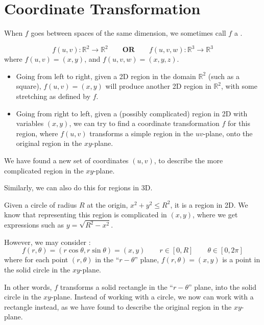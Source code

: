 \section{Coordinate Transformation}

\begin{definition}
    When $f$ goes between spaces of the same dimension, we sometimes call $f$ a . 

    $$f(u, v): \mathbb{R}^2 \to \mathbb{R}^2 \qquad \textbf{OR} \qquad f(u, v, w): \mathbb{R}^3 \to \mathbb{R}^3$$ where $f(u, v) = (x, y)$, and $f(u, v, w) = (x, y, z)$.
\end{definition}

\begin{itemize}
    \item Going from left to right, given a 2D region in the domain $\mathbb{R}^2$ (such as a square), $f(u, v) = (x, y)$ will produce another 2D region in $\mathbb{R}^2$, with some stretching as defined by $f$.

    \item Going from right to left, given a (possibly complicated) region in 2D with variables $(x, y)$, we can try to find a coordinate transformation $f$ for this region, where $f(u, v)$ transforms a simple region in the $uv$-plane, onto the original region in the $xy$-plane.
\end{itemize}

We have found a new set of coordinates $(u, v)$, to describe the more complicated region in the $xy$-plane.

Similarly, we can also do this for regions in 3D.

\begin{example}
    Given a  circle of radius $R$ at the origin, $x^2 + y^2 \le R^2$, it is a region in 2D. We know that representing this region is complicated in $(x, y)$, where we get expressions such as $y = \sqrt{R^2 - x^2}$.

    However, we may consider : $$f(r,\theta) = (r\cos{\theta},r\sin{\theta}) = (x,y) \qquad r \in [0,R] \qquad \theta \in [0,2\pi]$$ where for each point $(r,\theta)$ in the ``$r - \theta$'' plane, $f(r,\theta) = (x,y)$ is a point in the solid circle in the $xy$-plane.

    In other words, $f$ transforms a solid rectangle in the ``$r - \theta$'' plane, into the solid circle in the $xy$-plane. Instead of working with a circle, we now can work with a rectangle instead, as we have found  to describe the original region in the $xy$-plane.
\end{example}

